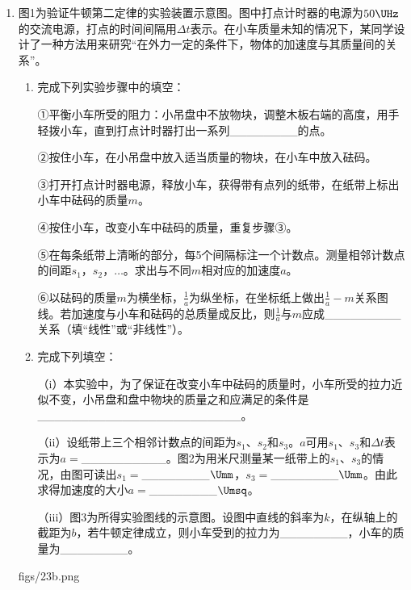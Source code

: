 \documentclass[\gkver]{gaokaozhenti}
\begin{document}
\begin{enumerate}
{（2）将 1、3 用导线相连后，两个 $1\Omega$ 的电阻并联后与第三个 $1\Omega$ 的电阻串联，总电阻为 $1.5\Omega$，再与第四个 $1\Omega$ 的电阻并联，等效电阻 $R=0.6\Omega$。
}

\item
图1为验证牛顿第二定律的实验装置示意图。图中打点计时器的电源为$50\UHz$的交流电源，打点的时间间隔用$\Delta t$表示。在小车质量未知的情况下，某同学设计了一种方法用来研究“在外力一定的条件下，物体的加速度与其质量间的关系”。
\begin{enumerate}
	\item
	完成下列实验步骤中的填空：

	①平衡小车所受的阻力：小吊盘中不放物块，调整木板右端的高度，用手轻拨小车，直到打点计时器打出一系列\_\_\_\_\_\_\_\_的点。

	②按住小车，在小吊盘中放入适当质量的物块，在小车中放入砝码。

	③打开打点计时器电源，释放小车，获得带有点列的纸带，在纸带上标出小车中砝码的质量$m$。

	④按住小车，改变小车中砝码的质量，重复步骤③。

	⑤在每条纸带上清晰的部分，每5个间隔标注一个计数点。测量相邻计数点的间距$s_{1}$，$s_{2}$，$\ldots$。求出与不同$m$相对应的加速度$a$。

	⑥以砝码的质量$m$为横坐标，$\frac{1}{a}$为纵坐标，在坐标纸上做出$\frac{1}{a}-m$关系图线。若加速度与小车和砝码的总质量成反比，则$\frac{1}{a}$与$m$应成\_\_\_\_\_\_\_\_\_关系（填“线性”或“非线性”）。

	\item
	完成下列填空：

	（i）本实验中，为了保证在改变小车中砝码的质量时，小车所受的拉力近似不变，小吊盘和盘中物块的质量之和应满足的条件是\_\_\_\_\_\_\_\_\_\_\_\_\_\_\_\_\_\_\_\_\_\_\_\_。

	（ii）设纸带上三个相邻计数点的间距为$s_{1}$、$s_{2}$和$s_{3}$。$a$可用$s_{1}$、$s_{3}$和$\Delta t$表示为$a=$\_\_\_\_\_\_\_\_\_\_。图2为用米尺测量某一纸带上的$s_{1}$、$s_{3}$的情况，由图可读出$s_{1}=$\_\_\_\_\_\_\_\_$\Umm$，$s_{3}=$\_\_\_\_\_\_\_\_$\Umm$。由此求得加速度的大小$a=$\_\_\_\_\_\_\_\_$\Umsq$。

	（iii）图3为所得实验图线的示意图。设图中直线的斜率为$k$，在纵轴上的截距为$b$，若牛顿定律成立，则小车受到的拉力为\_\_\_\_\_\_\_\_，小车的质量为\_\_\_\_\_\_\_\_。
\end{enumerate}
{figs/23b.png}
\end{enumerate}
\end{document}
